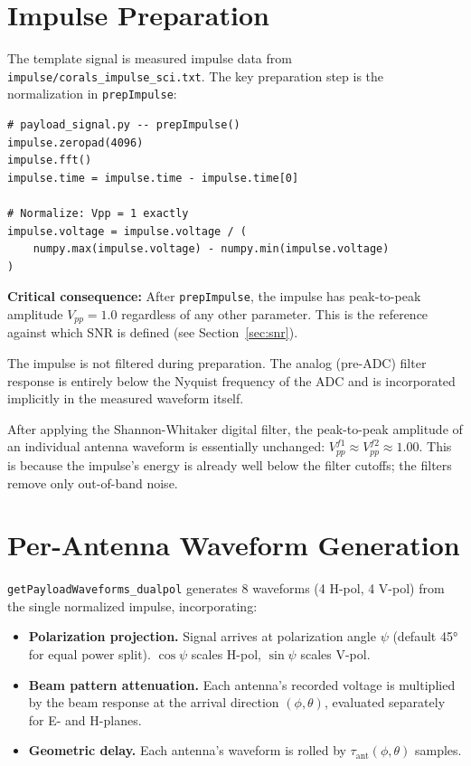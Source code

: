 \documentclass[11pt,letterpaper]{article}
\newenvironment{codebox}{%
  \begin{mdframed}[backgroundcolor=codebg,linewidth=0.5pt,innerleftmargin=6pt,innerrightmargin=6pt,innertopmargin=4pt,innerbottommargin=4pt]%
  \small}{\end{mdframed}}
\begin{document}
\section{Impulse Preparation}

The template signal is measured impulse data from
\texttt{impulse/corals\_impulse\_sci.txt}.  The key preparation step is the
normalization in \texttt{prepImpulse}:

\begin{codebox}
\begin{Verbatim}
# payload_signal.py -- prepImpulse()
impulse.zeropad(4096)
impulse.fft()
impulse.time = impulse.time - impulse.time[0]

# Normalize: Vpp = 1 exactly
impulse.voltage = impulse.voltage / (
    numpy.max(impulse.voltage) - numpy.min(impulse.voltage)
)
\end{Verbatim}
\end{codebox}

\textbf{Critical consequence:} After \texttt{prepImpulse}, the impulse has
peak-to-peak amplitude $V_{pp} = 1.0$ regardless of any other parameter.
This is the reference against which SNR is defined (see Section~\ref{sec:snr}).

The impulse is not filtered during preparation. The analog (pre-ADC) filter
response is entirely below the Nyquist frequency of the ADC and is
incorporated implicitly in the measured waveform itself.

After applying the Shannon-Whitaker digital filter, the peak-to-peak amplitude
of an individual antenna waveform is essentially unchanged:
$V_{pp}^{f1} \approx V_{pp}^{f2} \approx 1.00$. This is because the impulse's
energy is already well below the filter cutoffs; the filters remove only
out-of-band noise.

\section{Per-Antenna Waveform Generation}

\texttt{getPayloadWaveforms\_dualpol} generates 8 waveforms (4 H-pol,
4 V-pol) from the single normalized impulse, incorporating:

\begin{itemize}[nosep]
  \item \textbf{Polarization projection.} Signal arrives at polarization angle
        $\psi$ (default 45° for equal power split).
        $\cos\psi$ scales H-pol, $\sin\psi$ scales V-pol.
  \item \textbf{Beam pattern attenuation.}  Each antenna's recorded voltage is
        multiplied by the beam response at the arrival direction
        $(\phi, \theta)$, evaluated separately for E- and H-planes.
  \item \textbf{Geometric delay.} Each antenna's waveform is rolled by
        $\tau_\mathrm{ant}(\phi,\theta)$ samples.
\end{itemize}
\end{document}
